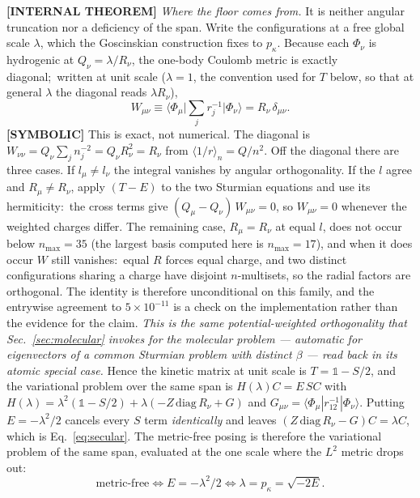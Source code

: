 \documentclass[aps,pra,twocolumn,superscriptaddress,longbibliography]{revtex4-2}
\begin{document}
\textbf{[INTERNAL THEOREM]} \emph{Where the floor comes from.}  It is neither
angular truncation nor a deficiency of the span.  Write the configurations at a
free global scale $\lambda$, which the Goscinskian construction fixes to
$p_\kappa$.  Because each $\Phi_\nu$ is hydrogenic at $Q_\nu=\lambda/R_\nu$, the
one-body Coulomb metric is exactly diagonal;\ written at unit scale
($\lambda=1$, the convention used for $T$ below, so that at general $\lambda$
the diagonal reads $\lambda R_\nu$),
\begin{equation}
  W_{\mu\nu}\equiv\Big\langle\Phi_\mu\Big|\sum_j r_j^{-1}\Big|\Phi_\nu\Big\rangle
    = R_\nu\,\delta_{\mu\nu}.
  \label{eq:W_diagonal}
\end{equation}
\textbf{[SYMBOLIC]} This is exact, not numerical.  The diagonal is
$W_{\nu\nu}=Q_\nu\sum_j n_j^{-2}=Q_\nu R_\nu^{2}=R_\nu$ from
$\langle 1/r\rangle_{n}=Q/n^{2}$.  Off the diagonal there are three cases.  If
$l_\mu\neq l_\nu$ the integral vanishes by angular orthogonality.  If the
$l$ agree and $R_\mu\neq R_\nu$, apply $(T-E)$ to the two Sturmian equations
and use its hermiticity:\ the cross terms give
$(Q_\mu-Q_\nu)\,W_{\mu\nu}=0$, so $W_{\mu\nu}=0$ whenever the weighted
charges differ.  The remaining case, $R_\mu=R_\nu$ at equal $l$, does not
occur below $n_{\max}=35$ (the largest basis computed here is
$n_{\max}=17$), and when it does occur $W$ still vanishes:\ equal $R$ forces
equal charge, and two distinct configurations sharing a charge have disjoint
$n$-multisets, so the radial factors are orthogonal.  The identity is
therefore unconditional on this family, and the entrywise agreement to
$5\times10^{-11}$ is a check on the implementation rather than the evidence
for the claim.  \emph{This is the same potential-weighted orthogonality that
Sec.~\ref{sec:molecular} invokes for the molecular problem --- automatic for
eigenvectors of a common Sturmian problem with distinct $\beta$ --- read back
in its atomic special case.}  Hence the kinetic matrix at unit scale
is $T=\mathbb{1}-S/2$, and the variational problem over the same span is
$H(\lambda)C=E\,SC$ with
$H(\lambda)=\lambda^{2}(\mathbb{1}-S/2)+\lambda(-Z\,\mathrm{diag}\,R_\nu+G)$ and
$G_{\mu\nu}=\langle\Phi_\mu|r_{12}^{-1}|\Phi_\nu\rangle$.  Putting
$E=-\lambda^{2}/2$ cancels every $S$ term \emph{identically} and leaves
$(Z\,\mathrm{diag}\,R_\nu-G)C=\lambda C$, which is Eq.~\eqref{eq:secular}.  The
metric-free posing is therefore the variational problem of the same span,
evaluated at the one scale where the $L^{2}$ metric drops out:
\begin{equation}
  \text{metric-free}\iff E=-\lambda^{2}/2\iff\lambda=p_\kappa=\sqrt{-2E}.
  \label{eq:scale_lock}
\end{equation}
\end{document}

